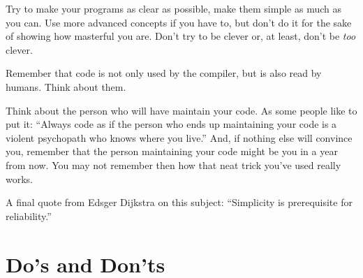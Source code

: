 Try to make your programs as clear as possible, make them 
simple as much as you can. Use more advanced concepts if 
you have to, but don't do it for the sake of showing how 
masterful you are. Don't try to be clever or, at least, 
don't be \emph{too} clever.

Remember that code is not only used by the compiler, but 
is also read by humans. Think about them.

Think about the person who will have maintain your code. 
As some people like to put it: ``Always code as if the person 
who ends up maintaining your code is a violent psychopath 
who knows where you live.'' And, if nothing else will convince 
you, remember that the person maintaining your code might be 
you in a year from now. You may not remember then 
how that neat trick you've used really works.

A final quote from Edsger Dijkstra on this subject: 
``Simplicity is prerequisite for reliability.''

\section{Do's and Don'ts}

